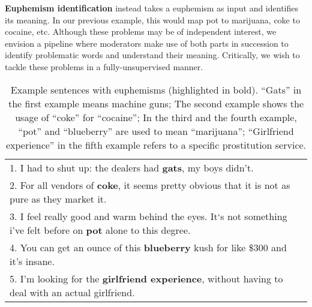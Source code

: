\textbf{Euphemism identification} instead takes a euphemism as input and identifies its meaning. 
In our previous example, this would map pot to marijuana, coke to cocaine, etc. 
Although these problems may be of independent interest, we envision a pipeline where moderators make use of both parts in succession to identify problematic words and understand their meaning. 
Critically, we wish to tackle these problems in a fully-unsupervised manner. 




\begin{table}[ht!]
	\centering
	\small
	\caption{Example sentences with euphemisms (highlighted in bold). ``Gats'' in the first example means machine guns; The second example shows the usage of ``coke'' for ``cocaine''; In the third and the fourth example, ``pot'' and ``blueberry'' are used to mean ``marijuana''; ``Girlfriend experience'' in the fifth example refers to a specific prostitution service. }
	\begin{tabular}{p{}}
		\toprule
		1. I had to shut up: the dealers had \textbf{gats}, my boys didn't. \\ 
		2. For all vendors of \textbf{coke}, it seems pretty obvious that it is not as pure as they market it. \\
		3. I feel really good and warm behind the eyes. It`s not something i've felt before on \textbf{pot} alone to this degree. \\
		4. You can get an ounce of this \textbf{blueberry} kush for like \$300 and it's insane. \\
		5. I'm looking for the \textbf{girlfriend experience}, without having to deal with an actual girlfriend. \\
		\bottomrule
	\end{tabular}
	\label{table:example1}
\end{table}



